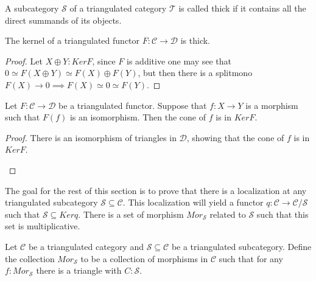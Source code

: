     \begin{definition}
        A subcategory $\mathcal{S}$ of a triangulated category $\mathcal{T}$ is called thick if it contains all the direct summands of its objects.
    \end{definition}

    \begin{lemma}
        The kernel of a triangulated functor $F:\mathcal{C}\rightarrow\mathcal{D}$ is thick.
    \end{lemma}

    \begin{proof}
        Let $X\oplus Y:KerF$, since $F$ is additive one may see that $0\simeq F(X\oplus Y)\simeq F(X)\oplus F(Y)$, but then there is a splitmono $F(X)\rightarrow 0 \implies F(X)\simeq 0 \simeq F(Y)$.
    \end{proof}

    \begin{lemma}
        Let $F:\mathcal{C}\rightarrow\mathcal{D}$ be a triangulated functor. Suppose that $f:X\rightarrow Y$ is a morphism such that $F(f)$ is an isomorphism. Then the cone of $f$ is in $KerF$.
    \end{lemma}

    \begin{proof}
        There is an isomorphism of triangles in $\mathcal{D}$, showing that the cone of $f$ is in $KerF$.
        \begin{center}
        \end{center}
    \end{proof}

    The goal for the rest of this section is to prove that there is a localization at any triangulated subcategory $\mathcal{S}\subseteq\mathcal{C}$. This localization will yield a functor $q:\mathcal{C}\rightarrow \mathcal{C}/\mathcal{S}$ such that $\mathcal{S}\subseteq Kerq$. There is a set of morphism $Mor_\mathcal{S}$ related to $\mathcal{S}$ such that this set is multiplicative.

    \begin{definition}
        Let $\mathcal{C}$ be a triangulated category and $\mathcal{S} \subseteq \mathcal{C}$ be a triangulated subcategory. Define the collection $Mor_{\mathcal{S}}$ to be a collection of morphisms in $\mathcal{C}$ such that for any $f : Mor_{\mathcal{S}}$ there is a triangle with $C : \mathcal{S}$.
        \begin{center}
        \end{center}
    \end{definition}


